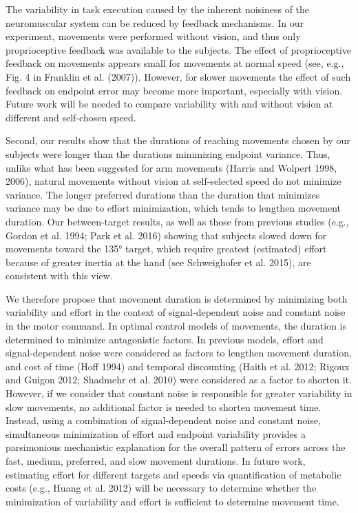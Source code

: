 The variability in task execution caused by the inherent noisiness of the neuromuscular system can be reduced by feedback mechanisms. In our experiment, movements were performed without vision, and thus only proprioceptive feedback was available to the subjects. 
The effect of proprioceptive feedback on movements appears small for movements at normal speed (see, e.g., Fig. 4 in \cite{Franklin2007} Franklin et al. (2007)). However, for slower movements the effect of such feedback on endpoint error may become more important, especially with vision. Future work will be needed to compare variability with and without vision at different and self-chosen speed.

Second, our results show that the durations of reaching movements chosen by our subjects were longer than the durations minimizing endpoint variance. Thus, unlike what has been suggested for arm movements \cite{Harris1998, Harris2006} (Harris and Wolpert 1998, 2006), natural movements without vision at self-selected speed do not minimize variance. The longer preferred durations than the duration that minimizes variance may be due to effort minimization, which tends to lengthen movement duration. Our between-target results, as well as those from previous studies (e.g., Gordon et al. 1994; Park et al. 2016) showing that subjects slowed down for movements toward the \ang{135} target, which require greatest (estimated) effort because of greater inertia at the hand (see \cite{Schweighofer2015} Schweighofer et al. 2015), are consistent with this view.

We therefore propose that movement duration is determined by minimizing both variability and effort in the context of signal-dependent noise and constant noise in the motor command. In optimal control models of movements, the duration is determined to minimize antagonistic factors. In previous models, effort and signal-dependent noise were considered as factors to lengthen movement duration, and cost of time \cite{Hoff1994} (Hoff 1994) and temporal discounting \cite{Haith2012, Rigoux2012, Shadmehr2010}(Haith et al. 2012; Rigoux and Guigon 2012; Shadmehr et al. 2010) were considered as a factor to shorten it. However, if we consider that constant noise is responsible for greater variability in slow movements, no additional factor is needed to shorten movement time. Instead, using a combination of signal-dependent noise and constant noise, simultaneous minimization of effort and endpoint variability provides a parsimonious mechanistic explanation for the overall pattern of errors across the fast, medium, preferred, and slow movement durations. In future work, estimating effort for different targets and speeds via quantification of metabolic costs (e.g., \cite{Huang2012} Huang et al. 2012) will be necessary to determine whether the minimization of variability and effort is sufficient to determine movement time.

